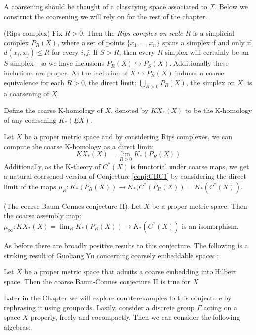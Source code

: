 A coarsening should be thought of a classifying space associated to $X$. Below we construct the coarsening we will rely on for the rest of the chapter.

\begin{example}
(Rips complex) Fix $R>0$. Then the \textit{Rips complex on scale $R$} is a simplicial complex $P_{R}(X)$, where a set of points $\lbrace x_{1},...,x_{n} \rbrace$ spans a simplex if and only if $d(x_{i},x_{j}) \leq R$ for every $i,j$. If $S>R$, then every $R$ simplex will certainly be an $S$ simplex - so we have inclusions $P_{R}(X)\hookrightarrow P_{S}(X)$. Additionally these inclusions are proper. As the inclusion of $X \hookrightarrow P_{R}(X)$ induces a coarse equivalence for each $R>0$, the direct limit: $\bigcup_{R>0}P_{R}(X)$, the simplex on $X$, is a coarsening of $X$.
\end{example}

\begin{definition}
Define the coarse K-homology of $X$, denoted by $KX_{*}(X)$ to be the K-homology of any coarsening $K_{*}(\underline{E}X)$.
\end{definition}

Let $X$ be a proper metric space and by considering Rips complexes, we can compute the coarse K-homology as a direct limit:
\begin{equation*}
KX_{*}(X) = \lim_{R>0}K_{*}(P_{R}(X))
\end{equation*}
Additionally, as the K-theory of $C^{*}(X)$ is functorial under coarse maps, we get a natural coarsened version of Conjecture \ref{conj:CBC1} by considering the direct limit of the maps $\mu_{R}: K_{*}(P_{R}(X)) \rightarrow K_{*}(C^{*}(P_{R}(X))=K_{*}(C^{*}(X))$.
\begin{conjecture}\label{conj:CBC2}(The coarse Baum-Connes conjecture II).
Let $X$ be a proper metric space. Then the coarse assembly map: $\mu_{\infty}:KX_{*}(X)= \lim_{R}K_{*}(P_{R}(X)) \rightarrow K_{*}(C^{*}(X))$ is an isomorphism. 
\end{conjecture}

As before there are broadly positive results to this conjecture. The following is a striking result of Guoliang Yu concerning coarsely embeddable spaces \cite{MR1728880}:
\begin{theorem}
Let $X$ be a proper metric space that admits a coarse embedding into Hilbert space. Then the coarse Baum-Connes conjecture II is true for $X$ 
\end{theorem}
Later in the Chapter we will explore counterexamples to this conjecture by rephrasing it using groupoids. Lastly, consider a discrete group $\Gamma$ acting on a space $X$ properly, freely and cocompactly. Then we can consider the following algebras:

